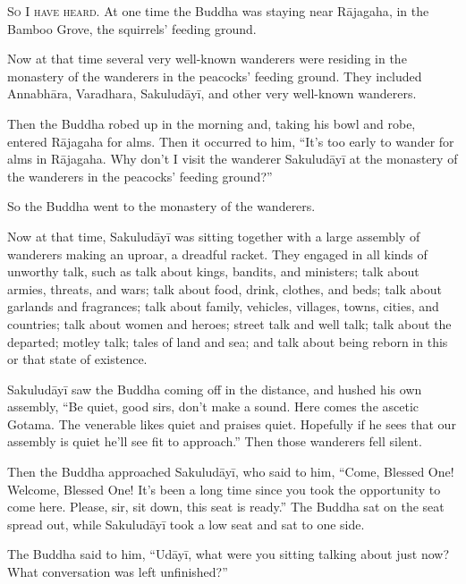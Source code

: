 \documentclass[12pt,openany]{book}%
\newcommand*{\scevam}[1]{\textsc{#1}}
\begin{document}
\scevam{So I have heard. }At one time the Buddha was staying near \textsanskrit{Rājagaha}, in the Bamboo Grove, the squirrels’ feeding ground. 

Now at that time several very well-known wanderers were residing in the monastery of the wanderers in the peacocks’ feeding ground. They included \textsanskrit{Annabhāra}, Varadhara, \textsanskrit{Sakuludāyī}, and other very well-known wanderers. 

Then the Buddha robed up in the morning and, taking his bowl and robe, entered \textsanskrit{Rājagaha} for alms. Then it occurred to him, “It’s too early to wander for alms in \textsanskrit{Rājagaha}. Why don’t I visit the wanderer \textsanskrit{Sakuludāyī} at the monastery of the wanderers in the peacocks’ feeding ground?” 

So the Buddha went to the monastery of the wanderers. 

Now at that time, \textsanskrit{Sakuludāyī} was sitting together with a large assembly of wanderers making an uproar, a dreadful racket. They engaged in all kinds of unworthy talk, such as talk about kings, bandits, and ministers; talk about armies, threats, and wars; talk about food, drink, clothes, and beds; talk about garlands and fragrances; talk about family, vehicles, villages, towns, cities, and countries; talk about women and heroes; street talk and well talk; talk about the departed; motley talk; tales of land and sea; and talk about being reborn in this or that state of existence. 

\textsanskrit{Sakuludāyī} saw the Buddha coming off in the distance, and hushed his own assembly, “Be quiet, good sirs, don’t make a sound. Here comes the ascetic Gotama. The venerable likes quiet and praises quiet. Hopefully if he sees that our assembly is quiet he’ll see fit to approach.” Then those wanderers fell silent. 

Then the Buddha approached \textsanskrit{Sakuludāyī}, who said to him, “Come, Blessed One! Welcome, Blessed One! It’s been a long time since you took the opportunity to come here. Please, sir, sit down, this seat is ready.” The Buddha sat on the seat spread out, while \textsanskrit{Sakuludāyī} took a low seat and sat to one side. 

The Buddha said to him, “\textsanskrit{Udāyī}, what were you sitting talking about just now? What conversation was left unfinished?” 
\end{document}
